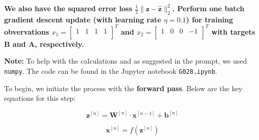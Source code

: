 \documentclass[12pt]{article}
\begin{document}
\begin{enumerate}[leftmargin=\labelsep]
          \vskip -0.5cm
          \textbf{We also have the squared error loss $\frac{1}{2} \|\mathbf{z} - \hat{\mathbf{z}}\|^{2}_{2}$. Perform one batch gradient descent update (with learning rate $\eta = 0.1$) for training
          obvervations $x_1 = \begin{bmatrix} 1 & 1 & 1 & 1 \\ \end{bmatrix}^T$ and $x_2 = \begin{bmatrix} 1 & 0 & 0 & -1 \\ \end{bmatrix}^T$ with targets B and A,
          respectively.}

          \vskip 0.3cm
          \textbf{Note:} To help with the calculations and as suggested in the prompt, we used \texttt{numpy}.
          The code can be found in the Jupyter notebook \texttt{G028.ipynb}.

          To begin, we initiate the process with the \textbf{forward pass}. Below are the key equations for this step:

            \begin{equation}\label{ex2-z}
                \mathbf{z}^{[n]} = \mathbf{W}^{[n]} \cdot \mathbf{x}^{[n-1]} + \mathbf{b}^{[n]}
            \end{equation}

            \begin{equation}\label{ex2-x}
                \mathbf{x}^{[n]} = f\left(\mathbf{z}^{[n]}\right)
            \end{equation}


\end{enumerate}
\end{document}
